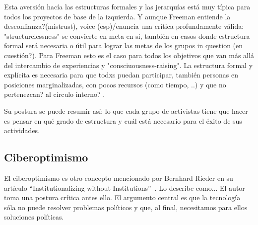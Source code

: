Esta aversión hacía las estructuras formales y las jerarquías está muy típica para todos los proyectos de base de la izquierda.
Y aunque Freeman entiende la desconfianza?(mistrust), voice (esp)/enuncia una crítica profundamente válida:
"structurelessness" se convierte en meta en si, también en casos donde estructura formal será necesaria o útil para lograr las metas de los grupos in question (en cuestión?).
Para Freeman esto es el caso para todos los objetivos que van más allá del intercambio de experiencias y "consciuousness-raising".
La estructura formal y explícita es necesaria para que todxs puedan participar, también personas en posiciones marginalizadas, con pocos recursos (como tiempo, ..) y que no pertenezcan? al círculo interno? \autocite{Freeman1970}.

Su postura se puede resumir así: lo que cada grupo de activistas tiene que hacer es pensar en qué grado de estructura y cuál está necesario para el éxito de sus actividades.

\subsection{Ciberoptimismo}

El ciberoptimismo es otro concepto mencionado por Bernhard Rieder en su artículo ``Institutionalizing without Institutions''~\autocite{Rieder2012}.
Lo describe como...
El autor toma una postura crítica antes ello.
El argumento central es que la tecnología sóla no puede resolver problemas políticos y que, al final, necesitamos para ellos soluciones políticas.


